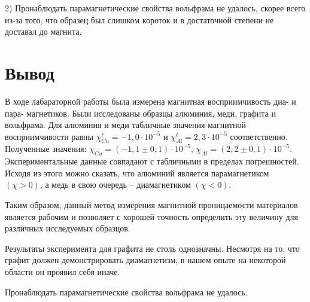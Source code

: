 \documentclass[11pt]{article}
\begin{document}
2) Пронаблюдать парамагнетические свойства вольфрама не удалось, скорее всего из-за того, что образец был слишком короток и в достаточной степени не доставал до магнита.

\section{Вывод} 

В ходе лабараторной работы была измерена магнитная восприимчивость диа- и пара- магнетиков. Были исследованы образцы алюминия, меди, графита и вольфрама. Для алюминия и меди табличные значения магнитной восприимчивости равны \underline{$ \chi_{Cu}^t = -1,0 \cdot 10^{-5} $} и \underline{$ \chi_{Al}^t = 2,3 \cdot 10^{-5} $} соответственно. Полученные значения:  \underline {$\chi_{Cu} = (-1,1 \pm 0,1)\cdot 10^{-5}$}, \underline{$\chi_{Al} = (2,2 \pm 0,1)\cdot 10^{-5}$}. Экспериментальные данные совпадают с табличными в пределах погрешностей. Исходя из этого можно сказать, что алюминий является парамагнетиком $ (\chi > 0) $, а медь в свою очередь -- диамагнетиком $ (\chi < 0) $.

Таким образом, данный метод измерения магнитной проницаемости материалов является рабочим и позволяет с хорошей точность определить эту величину для различных исследуемых образцов.


Результаты эксперимента для графита не столь однозначны. Несмотря на то, что графит должен демонстрировать диамагнетизм, в нашем опыте на некоторой области он проявил себя иначе. 

Пронаблюдать парамагнетические свойства вольфрама не удалось.
\end{document}
